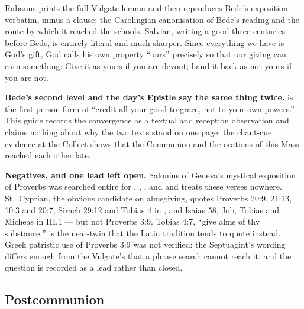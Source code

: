 \begin{witnessnote}
Rabanus prints the full Vulgate lemma and then reproduces Bede's exposition
verbatim, minus a clause: the Carolingian canonisation of Bede's reading and
the route by which it reached the schools. Salvian, writing a good three
centuries before Bede, is entirely literal and much sharper. Since everything
we have is God's gift, God calls his own property ``ours'' precisely so that
our giving can earn something:  Give it as yours if you are devout; hand it back as not
yours if you are not.
\end{witnessnote}

\textbf{Bede's second level and the day's Epistle say the same thing twice.}
 is the first-person form of ``credit
all your good to grace, not to your own powers.'' This guide records the
convergence as a textual and reception observation and claims nothing about
why the two texts stand on one page; the chant-cue evidence at the Collect
shows that the Communion and the orations of this Mass reached each other
late.

\textbf{Negatives, and one lead left open.} Salonius of Geneva's mystical
exposition of Proverbs was searched entire for ,
, ,  and  and
treats these verses nowhere. St.~Cyprian, the obvious candidate on almsgiving,
quotes Proverbs 20:9, 21:13, 10:3 and 20:7, Sirach 29:12 and Tobias 4 in
, and Isaias 58, Job, Tobias and Micheas in
 III.1 --- but not Proverbs 3:9. Tobias 4:7, ``give alms of
thy substance,'' is the near-twin that the Latin tradition tends to quote
instead. Greek patristic use of Proverbs 3:9 was not verified: the Septuagint's
wording differs enough from the Vulgate's that a phrase search cannot reach it,
and the question is recorded as a lead rather than closed.

\elementguard
\subsection*{Postcommunion }


